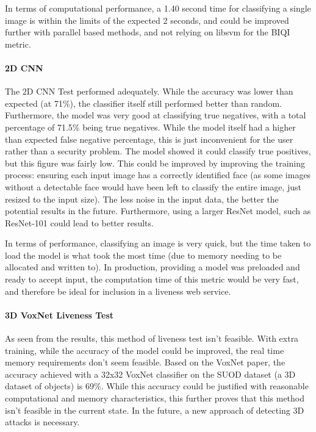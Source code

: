 \documentclass[10pt,a4paper]{article}
\begin{document}
            In terms of computational performance, a 1.40 second time for classifying a single image is within the limits of the expected 2 seconds, and could be improved further
            with parallel based methods, and not relying on libsvm for the BIQI metric.
        \paragraph{2D CNN}
            The 2D CNN Test performed adequately. While the accuracy was lower than expected (at 71\%), the classifier itself still performed better than random.
            Furthermore, the model was very good at classifying true negatives, with a total percentage of 71.5\% being true negatives. While the model itself had
            a higher than expected false negative percentage, this is just inconvenient for the user rather than a security problem. The model showed it could classify true
            positives, but this figure was fairly low. This could be improved by improving the training process: ensuring each input image has a correctly identified face (as
            some images without a detectable face would have been left to classify the entire image, just resized to the input size). The less noise in the input data, the better the potential
            results in the future. Furthermore, using a larger ResNet model, such as ResNet-101 could lead to better results.

            In terms of performance, classifying an image is very quick, but the time taken to load the model is what took the most time (due to memory needing to be allocated and written to).
            In production, providing a model was preloaded and ready to accept input, the computation time of this metric would be very fast, and therefore be ideal for inclusion in a liveness web service.
        
        \paragraph{3D VoxNet Liveness Test}
            As seen from the results, this method of liveness test isn't feasible. With extra training, while the accuracy of the model could be improved, the
            real time memory requirements don't seem feasible. Based on the VoxNet paper, the accuracy achieved with a 32x32 VoxNet classifier on the SUOD dataset (a 3D dataset of objects)
            is 69\%. While this accuracy could be justified with reasonable computational and memory characteristics, this further proves that this method isn't feasible in the current state. In the future, a new approach of detecting 3D attacks is necessary.
    
\end{document}
